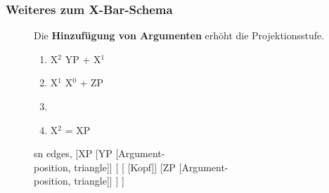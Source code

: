 \begin{frame}
\frametitle{Weiteres zum X-Bar-Schema}

\begin{figure}[b]

  	\begin{minipage}[b]{0.45\textwidth}
	Die \textbf{Hinzufügung von Argumenten} erhöht die Projektionsstufe.
	\begin{enumerate}
		\item X$^2$ \ras YP + X$^1$
		\item X$^1$ \ras X$^0$ + ZP
		\item[]
		\item X$^2$ = XP
	\end{enumerate}
	
  	\end{minipage}  
	\begin{minipage}[b]{0.45\textwidth}
	\centering
	\footnotesize{
		\begin{forest}
		sn edges,
		[\alert{XP} [YP [Argument-\\position, triangle]]
			[\alert{}
				[\alert{} [Kopf]]
				[ZP [Argument-\\position, triangle]]
			]
		]
		\end{forest}
		}
  	\end{minipage}  
\end{figure}

\end{frame}



